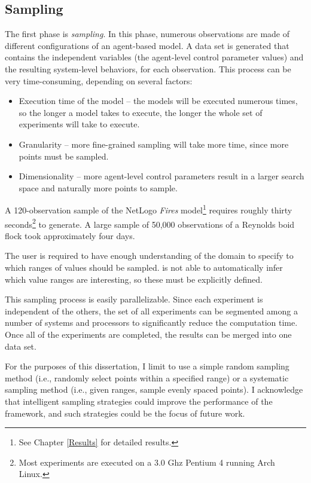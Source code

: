 \subsection{Sampling}
The first phase is \textit{sampling}.
In this phase, numerous observations are made of different configurations of an agent-based model.
A data set is generated that contains the independent variables (the agent-level control parameter values) and the resulting system-level behaviors, for each observation.
This process can be very time-consuming, depending on several factors:
\begin{itemize}
  \item Execution time of the model -- the models will be executed numerous times, so the longer a model takes to execute, the longer the whole set of experiments will take to execute.
  \item Granularity -- more fine-grained sampling will take more time, since more points must be sampled.
  \item Dimensionality -- more agent-level control parameters result in a larger search space and naturally more points to sample.
\end{itemize}
A 120-observation sample of the NetLogo \textit{Fires} model\footnote{See Chapter \ref{Results} for detailed results.} \cite{fires} requires roughly thirty seconds\footnote{Most experiments are executed on a 3.0 Ghz Pentium 4 running Arch Linux.} to generate.
A large sample of 50,000 observations of a Reynolds boid flock \cite{reynolds1987} took approximately four days.

The user is required to have enough understanding of the domain to specify to \fw which  ranges of values should be sampled.
\fw is not able to automatically infer which value ranges are interesting, so these must be explicitly defined.

This sampling process is easily parallelizable.
Since each experiment is independent of the others, the set of all experiments can be segmented among a number of systems and processors to significantly reduce the computation time.
Once all of the experiments are completed, the results can be merged into one data set.

For the purposes of this dissertation, I limit \fw to use a simple random sampling method (i.e., randomly select points within a specified range) or a systematic sampling method (i.e., given ranges, sample evenly spaced points).
I acknowledge that intelligent sampling strategies could improve the performance of the framework, and such strategies could be the focus of future work.


